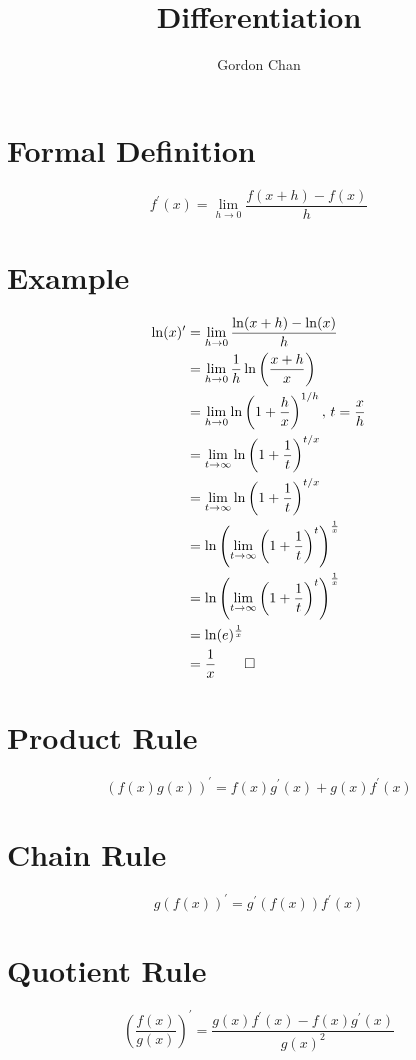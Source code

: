 \documentclass[a4paper]{article}
\title{Differentiation}
\date{}
\author{Gordon Chan}
\begin{document}
\maketitle
\section{Formal Definition}

\[f^\prime(x)=\lim\limits_{h\to0}\frac{f(x+h)-f(x)}h\]

\section{Example}

\[\begin{aligned}
    \ln(x)^\prime
    &=\lim\limits_{h\to0}\frac{\ln(x+h)-\ln(x)}h\\
    &=\lim\limits_{h\to0}\frac1h\ln\left(\frac{x+h}x\right)\\
    &=\lim\limits_{h\to0}\ln\left(1+\frac hx\right)^{1/h},\, t=\frac xh\\
    &=\lim\limits_{t\to\infty}\ln\left(1+\frac1t\right)^{t/x}\\
    &=\lim\limits_{t\to\infty}\ln\left(1+\frac1t\right)^{t/x}\\
    &=\ln\left(\lim\limits_{t\to\infty}\left(1+\frac1t\right)^t\right)^{\frac1x}\\
    &=\ln\left(\lim\limits_{t\to\infty}\left(1+\frac1t\right)^t\right)^{\frac1x}\\
    &=\ln(e)^{\frac1x}\\
    &=\frac1x\qed
\end{aligned}\]

\section{Product Rule}

\[(f(x)g(x))^\prime=f(x)g^\prime(x)+g(x)f^\prime(x)\]

\section{Chain Rule}

\[g(f(x))^\prime=g^\prime(f(x))f^\prime(x)\]

\section{Quotient Rule}

\[\left(\frac{f(x)}{g(x)}\right)^\prime=\frac{g(x)f^\prime(x)-f(x)g^\prime(x)}{g(x)^2}\]
\end{document}
